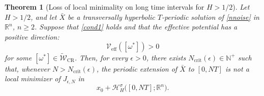 \documentclass[preprint,12pt]{elsarticle}
\newtheorem{theorem}{Theorem}[section]
\theoremstyle{definition}
\theoremstyle{plain}
\begin{document}
\begin{theorem}[Loss of local minimality on long time intervals for $H>1/2$]
\label{thm:H-greater-half-collapse}
Let $H>1/2$, and let $\bar X$ be a transversally hyperbolic
$T$-periodic solution of \eqref{nnoise} in $\mathbb R^n$, $n\geq2$.
Suppose that \eqref{cond1} holds and that the effective potential has
a positive direction:
\begin{equation*}
    \mathcal V_{\mathrm{eff}}([\omega^*])>0
\end{equation*}
for some
$[\omega^*]\in\widetilde{\mathcal W}_{\mathrm{CR}}$. Then, for every
$\epsilon>0$, there exists
$N_{\mathrm{crit}}(\epsilon)\in\mathbb N^+$ such that, whenever
$N>N_{\mathrm{crit}}(\epsilon)$, the periodic extension of $\bar X$ to
$[0,NT]$ is not a local minimizer of $J_{\epsilon,N}$ in
\begin{equation*}
    x_0+
    \mathcal H_H^\sigma\bigl([0,NT];\mathbb R^n\bigr).
\end{equation*}
\end{theorem}
\end{document}
